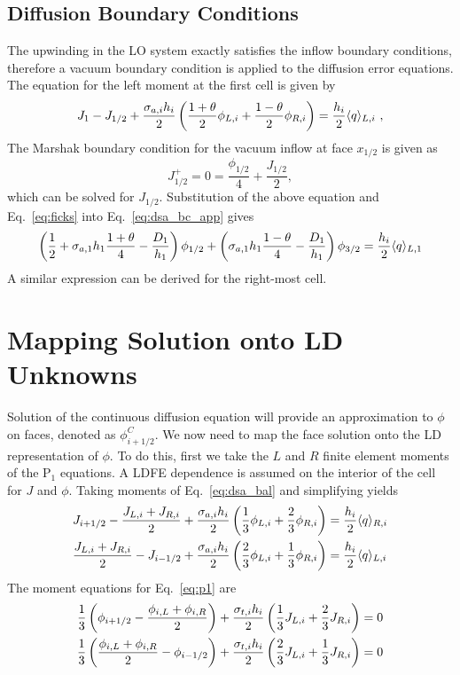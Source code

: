 \subsection{Diffusion Boundary Conditions}

The upwinding in the LO system exactly satisfies the inflow boundary conditions, therefore
a vacuum boundary condition is applied to the diffusion error equations.  The equation for the left moment
at the first cell is given by
\begin{equation}\label{eq:dsa_bc_app}
    J_{1} - J_{1/2}  + \frac{\sigma_{a,i}h_i}{2} \left(\frac{1+\theta}{2} \phi_{L,i}
    + \frac{1-\theta}{2}
    \phi_{R,i} \right) = \frac{h_i}{2} \langle q \rangle_{L,i}\,\,,
\end{equation}
The Marshak boundary condition for the vacuum inflow at face $x_{1/2}$ is given as
\begin{equation}
    J^+_{1/2} = 0 = \frac{\phi_{1/2}}{4} + \frac{J_{1/2}}{2},
\end{equation}
which can be solved for $J_{1/2}$.  Substitution of the above equation and
Eq.~\eqref{eq:ficks} into Eq.~\eqref{eq:dsa_bc_app} gives 
\begin{equation}\label{eq:bc_dsa}
    \left(\frac{1}{2}+ \sigma_{a,1}h_1\frac{1+\theta}{4} - \frac{D_1}{h_1}\right)\phi_{1/2} +
    \left( {\sigma_{a,1}{h_1}}\frac{1-\theta}{4} - \frac{D_1}{h_1}  \right)\phi_{3/2} =
    \frac{h_i}{2} \langle q \rangle_{L,1}
\end{equation}
A similar expression can be derived for the right-most cell.

\section{Mapping Solution onto LD Unknowns}

Solution of the continuous diffusion equation will provide an approximation to $\phi$ on
faces, denoted as $\phi_{i+1/2}^C$. We now need to map the face solution onto 
the LD representation of $\phi$. To do this, first we take the $L$ and $R$ finite element moments of the P$_1$
equations.  A LDFE dependence is assumed on the interior of the cell for $J$ and
$\phi$.  Taking moments of Eq.~\eqref{eq:dsa_bal} and simplifying yields
\begin{align}
    J_{{i+1/2}} - \frac{J_{L,i} + J_{R,i}}{2} + \frac{\sigma_{a,i} h_i}{2} \left(\frac{1}{3} \phi_{L,i} +
    \frac{2}{3}\phi_{R,i}\right) &= \frac{h_i}{2} \langle q \rangle_{R,i} \\
    \frac{J_{L,i} + J_{R,i}}{2} - J_{i-1/2} + \frac{\sigma_{a,i} h_i}{2}
    \left(\frac{2}{3} \phi_{L,i} +
    \frac{1}{3}\phi_{R,i}\right) &= \frac{h_i}{2} \langle q \rangle_{L,i}
\end{align}
The moment equations for Eq.~\eqref{eq:p1} are
\begin{align}
    \frac{1}{3}\left(\phi_{{i+1/2}} - \frac{\phi_{i,L} + \phi_{i,R}}{2}\right) +
    \frac{\sigma_{t,i} h_i}{2} \left(\frac{1}{3} J_{L,i} + \frac{2}{3}J_{R,i}\right)
    &= 0 \\
    \frac{1}{3}\left(\frac{\phi_{i,L} + \phi_{i,R}}{2} - \phi_{i-1/2} \right) +
    \frac{\sigma_{t,i} h_i}{2} \left(\frac{2}{3} J_{L,i} + \frac{1}{3}J_{R,i}\right)
    &= 0 
\end{align}

